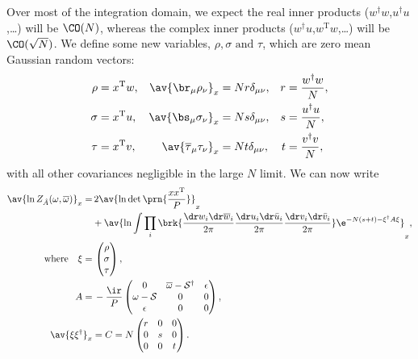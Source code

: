 \documentclass[12pt]{article}
\newcommand{\dg}{^\dagger}
\newcommand{\trans}{^\mathrm{T}}
\newcommand{\shift}{\mathcal{S}}
\newcommand{\aest}{\hat{A}}
\newcommand{\omb}{\overline{\omega}}
\newcommand{\bt}{\overline{\tau}}
\newcommand{\dw}{\dr w}
\newcommand{\dwb}{\dr\overline{w}}
\newcommand{\du}{\dr u}
\newcommand{\dub}{\dr\bar{u}}
\newcommand{\dv}{\dr v}
\newcommand{\dvb}{\dr\bar{v}}
\begin{document}
Over most of the integration domain, we expect the real inner products ($w\dg w$,$u\dg u$,\ldots) will be $\CO(N)$, whereas the complex inner products ($w\dg u$,$w\trans w$,\ldots) will be $\CO(\sqrt{N})$.
We define some new variables, $\rho,\sigma \text{ and } \tau$, which are zero mean Gaussian random vectors:
%
\begin{equation}\label{eq:rstdef}
\begin{aligned}
  \rho &= x\trans w ,
    & \av{\br_\mu \rho_\nu}_x &= Nr\delta_{\mu\nu} ,
    & r&=\frac{w\dg w}{N}, \\
  \sigma &= x\trans u ,
    & \av{\bs_\mu \sigma_\nu}_x &= Ns\delta_{\mu\nu} ,
    & s&=\frac{u\dg u}{N}, \\
  \tau &= x\trans v,
    & \av{\bt_\mu \tau_\nu}_x &= Nt\delta_{\mu\nu},
    & t&=\frac{v\dg v}{N}, \\
\end{aligned}
\end{equation}
%
with all other covariances negligible in the large $N$ limit.
We can now write
%
\begin{equation}\label{eq:potwuv}
\begin{aligned}
  \av{\ln Z_{\aest} (\omega,\omb)}_x =&\,  2\av{\ln\det\prn{\frac{xx\trans}{P}}}_x
  \\&
        +\av{\ln\int \prod_i\brk{ \frac{\dw_i\dwb_i}{2\pi} \frac{\du_i\dub_i}{2\pi} \frac{\dv_i\dvb_i}{2\pi} } \e^{-N(s+t)-\xi\dg A  \xi} }_{x} ,
  \\ \text{where}\quad
  \xi =&\, \begin{pmatrix}
           \rho \\
           \sigma \\
           \tau \\
         \end{pmatrix},
 \\
  A =&\, -\frac{\ir}{P}
       \begin{pmatrix}
         0        & \omb-\shift\dg & \epsilon \\
         \omega-\shift & 0            & 0 \\
         \epsilon & 0            & 0 \\
       \end{pmatrix},\\
  \av{\xi\xi\dg}_x &=  C = N\begin{pmatrix}
         r & 0 & 0 \\
         0 & s & 0 \\
         0 & 0 & t \\
       \end{pmatrix}.
\end{aligned}
\end{equation}
\end{document}
